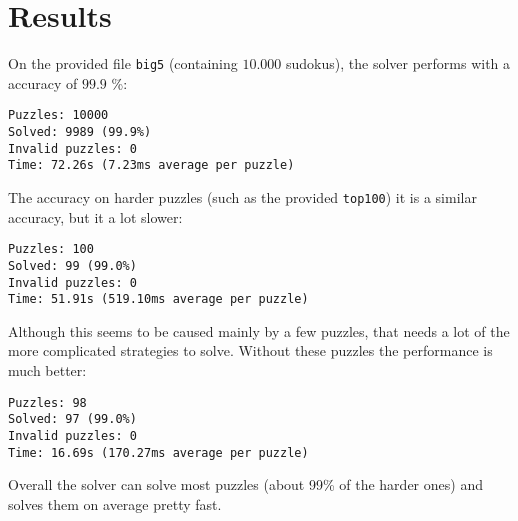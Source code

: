 \documentclass[11pt, a4paper, fleqn]{article}
\begin{document}
\section{Results}
On the provided file \texttt{big5} (containing $10.000$ sudokus), the solver performs with a 
accuracy of $99.9$ \%:
\begin{verbatim}
Puzzles: 10000
Solved: 9989 (99.9%)
Invalid puzzles: 0
Time: 72.26s (7.23ms average per puzzle)
\end{verbatim}

The accuracy on harder puzzles (such as the provided \texttt{top100}) it is a similar
accuracy, but it a lot slower:
\begin{verbatim}
Puzzles: 100
Solved: 99 (99.0%)
Invalid puzzles: 0
Time: 51.91s (519.10ms average per puzzle)
\end{verbatim}

Although this seems to be caused mainly by a few puzzles, that needs a lot of the
more complicated strategies to solve. Without these puzzles the performance is much
better:
\begin{verbatim}
Puzzles: 98
Solved: 97 (99.0%)
Invalid puzzles: 0
Time: 16.69s (170.27ms average per puzzle)
\end{verbatim}

Overall the solver can solve most puzzles (about 99\% of the harder ones) and solves them on average pretty fast.
\end{document}
